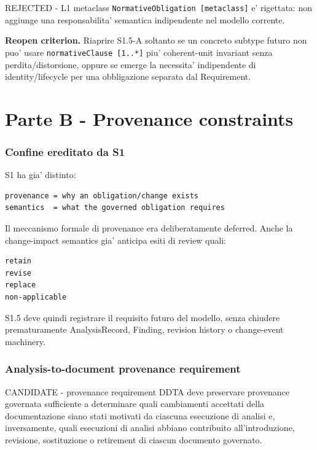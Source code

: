 \documentclass[11pt,a4paper]{article}
\begin{document}
\begin{openbox}{REJECTED - L1 metaclass}
\texttt{NormativeObligation [metaclass]} e' rigettata: non aggiunge una responsabilita' semantica indipendente nel modello corrente.
\end{openbox}

\textbf{Reopen criterion.} Riaprire S1.5-A soltanto se un concreto subtype futuro non puo' usare \texttt{normativeClause [1..*]} piu' coherent-unit invariant senza perdita/distorsione, oppure se emerge la necessita' indipendente di identity/lifecycle per una obbligazione separata dal Requirement.

\newpage
\part*{Parte B - Provenance constraints}

\section{Confine ereditato da S1}

S1 ha gia' distinto:

\begin{lstlisting}
provenance = why an obligation/change exists
semantics  = what the governed obligation requires
\end{lstlisting}

Il meccanismo formale di provenance era deliberatamente deferred. Anche la change-impact semantics gia' anticipa esiti di review quali:

\begin{lstlisting}
retain
revise
replace
non-applicable
\end{lstlisting}

S1.5 deve quindi registrare il requisito futuro del modello, senza chiudere prematuramente AnalysisRecord, Finding, revision history o change-event machinery.

\section{Analysis-to-document provenance requirement}

\begin{statusbox}{CANDIDATE - provenance requirement}
DDTA deve preservare provenance governata sufficiente a determinare quali cambiamenti accettati della documentazione siano stati motivati da ciascuna esecuzione di analisi e, inversamente, quali esecuzioni di analisi abbiano contribuito all'introduzione, revisione, sostituzione o retirement di ciascun documento governato.
\end{statusbox}
\end{document}
